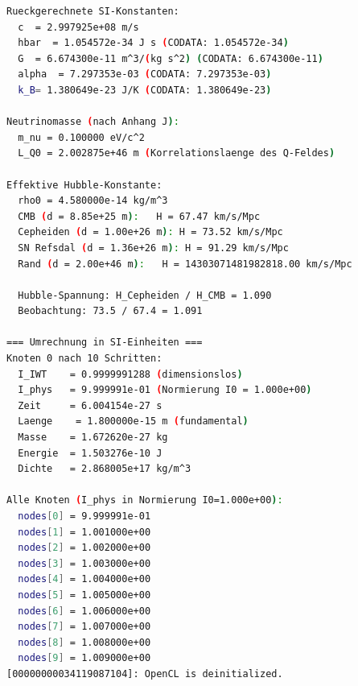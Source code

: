 \documentclass[12pt,a4paper]{article}
\begin{document}
\begin{appendices}
\begin{lstlisting}[language=bash, caption=simulation.log]
Rueckgerechnete SI-Konstanten:
  c  = 2.997925e+08 m/s
  hbar  = 1.054572e-34 J s (CODATA: 1.054572e-34)
  G  = 6.674300e-11 m^3/(kg s^2) (CODATA: 6.674300e-11)
  alpha  = 7.297353e-03 (CODATA: 7.297353e-03)
  k_B= 1.380649e-23 J/K (CODATA: 1.380649e-23)

Neutrinomasse (nach Anhang J):
  m_nu = 0.100000 eV/c^2
  L_Q0 = 2.002875e+46 m (Korrelationslaenge des Q-Feldes)

Effektive Hubble-Konstante:
  rho0 = 4.580000e-14 kg/m^3
  CMB (d = 8.85e+25 m):   H = 67.47 km/s/Mpc
  Cepheiden (d = 1.00e+26 m): H = 73.52 km/s/Mpc
  SN Refsdal (d = 1.36e+26 m): H = 91.29 km/s/Mpc
  Rand (d = 2.00e+46 m):   H = 14303071481982818.00 km/s/Mpc

  Hubble-Spannung: H_Cepheiden / H_CMB = 1.090
  Beobachtung: 73.5 / 67.4 = 1.091

=== Umrechnung in SI-Einheiten ===
Knoten 0 nach 10 Schritten:
  I_IWT    = 0.9999991288 (dimensionslos)
  I_phys   = 9.999991e-01 (Normierung I0 = 1.000e+00)
  Zeit     = 6.004154e-27 s
  Laenge    = 1.800000e-15 m (fundamental)
  Masse    = 1.672620e-27 kg
  Energie  = 1.503276e-10 J
  Dichte   = 2.868005e+17 kg/m^3

Alle Knoten (I_phys in Normierung I0=1.000e+00):
  nodes[0] = 9.999991e-01
  nodes[1] = 1.001000e+00
  nodes[2] = 1.002000e+00
  nodes[3] = 1.003000e+00
  nodes[4] = 1.004000e+00
  nodes[5] = 1.005000e+00
  nodes[6] = 1.006000e+00
  nodes[7] = 1.007000e+00
  nodes[8] = 1.008000e+00
  nodes[9] = 1.009000e+00
[00000000034119087104]: OpenCL is deinitialized.
\end{lstlisting}

\end{appendices}
\end{document}
